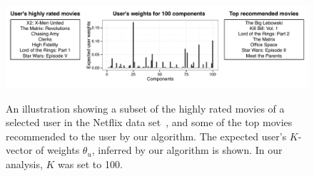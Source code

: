 \begin{figure}
\centering
\includegraphics[width=\textwidth]{figures/netflix-exploratory.pdf}\\
\caption{An illustration showing a subset of the highly rated movies
  of a selected user in the Netflix data set~\cite{Koren:2009}, and
  some of the top movies recommended to the user by our algorithm. The
  expected user's $K$-vector of weights $\theta_u$, inferred by our
  algorithm is shown. In our analysis, $K$ was set to 100.}
\label{fig:netflix-illustration}
\end{figure}









